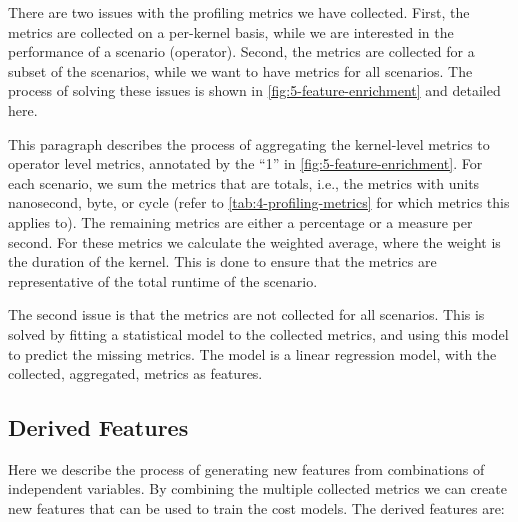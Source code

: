There are two issues with the profiling metrics we have collected. First, the metrics are collected on a per-kernel basis, while we are interested in the performance of a scenario (operator). Second, the metrics are collected for a subset of the scenarios, while we want to have metrics for all scenarios. The process of solving these issues is shown in \autoref{fig:5-feature-enrichment} and detailed here.

This paragraph describes the process of aggregating the kernel-level metrics to operator level metrics, annotated by the “1” in \autoref{fig:5-feature-enrichment}. For each scenario, we sum the metrics that are totals, i.e., the metrics with units nanosecond, byte, or cycle (refer to \autoref{tab:4-profiling-metrics} for which metrics this applies to). The remaining metrics are either a percentage or a measure per second. For these metrics we calculate the weighted average, where the weight is the duration of the kernel. This is done to ensure that the metrics are representative of the total runtime of the scenario.

The second issue is that the metrics are not collected for all scenarios. This is solved by fitting a statistical model to the collected metrics, and using this model to predict the missing metrics. The model is a linear regression model, with the collected, aggregated, metrics as features.

\subsection{Derived Features}
Here we describe the process of generating new features from combinations of independent variables. By combining the multiple collected metrics we can create new features that can be used to train the cost models. The derived features are:

